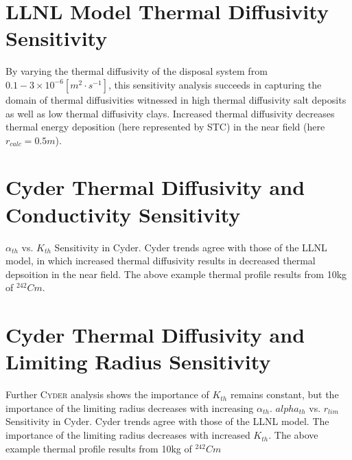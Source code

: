 \documentclass[letterpaper]{article}
\newcommand{\Cyder}{\textsc{Cyder}\xspace}
\begin{document}
\section*{LLNL Model Thermal Diffusivity Sensitivity}
  By varying the thermal diffusivity of the disposal system from $0.1-3\times 
  10^{-6} [m^2\cdot s^{-1}]$, this sensitivity analysis succeeds in capturing 
  the domain of 
  thermal diffusivities witnessed in high thermal diffusivity salt deposits as 
  well as low thermal diffusivity clays.
    Increased thermal diffusivity decreases thermal energy deposition (here represented by STC) in the near field (here $r_{calc} = 0.5m$).


\section*{Cyder Thermal Diffusivity and Conductivity Sensitivity}
$\alpha_{th}$ vs. $K_{th}$ Sensitivity in Cyder. Cyder trends agree
  with those of the LLNL model, in which increased thermal diffusivity results 
  in 
  decreased thermal depsoition in the near field. The above example thermal 
  profile results from 10kg of $^{242}Cm$.

\section*{Cyder Thermal Diffusivity and Limiting Radius Sensitivity}
  Further \Cyder analysis shows the importance of $K_{th}$ remains constant, 
  but 
  the importance of the limiting radius decreases with increasing 
  $\alpha_{th}$.
  $alpha_{th}$ vs. $r_{lim}$ Sensitivity in Cyder.
  Cyder trends agree with 
  those of the LLNL model. The importance of the limiting radius decreases with 
  increased $K_{th}$. The above example thermal profile results from 10kg of 
  $^{242}Cm$
\end{document}
